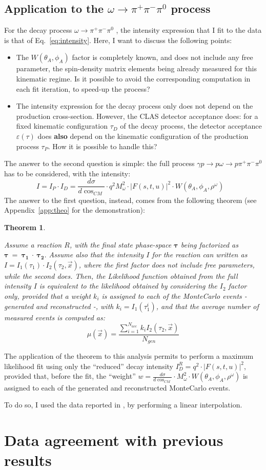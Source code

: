 \documentclass[a4paper,10pt]{report}
\newcommand{\decay}{$\omega \rightarrow \pi^+ \pi^- \pi^0$ }
\newcommand{\fullreaction}{$\gamma p \rightarrow p \omega \rightarrow p \pi^+ \pi^- \pi^{0}$ }
\newtheorem{theorem}{Theorem}
\newcommand{\printteolike}{
Assume a reaction $R$, with the final state phase-space $\mathbf{\tau}$ being factorized as $\mathbf{\tau}~=~\mathbf{\tau_1}~\cdot~\mathbf{\tau_2}$.
Assume also that the intensity $I$ for the reaction can written as $I=I_1(\tau_1) \cdot I_2(\tau_2,\vec{x})$,
where the first factor does not include free parameters, while the second does. Then, the Likelihood function obtained from the full intensity $I$ is equivalent to the
likelihood obtained by considering the $I_2$ factor only, provided that a weight $k_i$ is assigned to each of the MonteCarlo events -generated and reconstructed -, with $k_i=I_1(\tau^i_1)$, and that the average number of measured events is computed as:
\begin{equation}
\mu(\vec{x})=\frac{\sum_{i=1}^{N_{acc}}k_iI_2(\tau_2,\vec{x})}{N_{gen}}
\end{equation}
}
\begin{document}
\section{Application to the \decay process}\label{sec:application}

For the decay process \decay, the intensity expression that I fit to the data is that of Eq.~\ref{eq:intensity}. Here, I want to discuss the following points:
\begin{itemize}
\item{The $W(\theta_A,\phi_A)$ factor is completely known, and does not include any free parameter, the spin-density matrix elements being already measured for this kinematic regime.
Is it possible to avoid the corresponding computation in each fit iteration, to speed-up the process?}
\item{The intensity expression for the decay process only does not depend on the production cross-section. However, the CLAS detector acceptance does: for a fixed kinematic configuration $\tau_D$ of the decay process,
the detector acceptance $\varepsilon(\tau)$ does \textbf{also} depend on the kinematic configuration of the production process $\tau_P$. How it is possible to handle this?}
\end{itemize}

The answer to the second question is simple: the full process \fullreaction has to be considered, with the intensity:
\begin{equation}\label{eq:fullintensity}
I = I_P \cdot I_D = \frac{d\sigma}{d\cos_{CM}}\cdot q^2M^2_\omega \cdot |F(s,t,u)|^2 \cdot W(\theta_A, \phi_A, \rho^\omega) \; \; \;
\end{equation}
The answer to the first question, instead, comes from the following theorem (see Appendix~\ref{app:theo} for the demonstration):
\begin{theorem}
\label{theorem}
\printteolike
\end{theorem}

The application of the theorem to this analysis permits to perform a maximum likelihood fit using only the ``reduced'' decay intensity $I^{R}_D=q^2\cdot |F(s,t,u)|^2$, provided that, before the fit, the ``weight'' 
$w= \frac{d\sigma}{d\cos_{CM}}\cdot M^2_\omega \cdot W(\theta_A, \phi_A, \rho^\omega)$ is assigned to each of the generated and reconstructed MonteCarlo events.

To do so, I used the data reported in \cite{Williams:2009ab}, by performing a linear interpolation. 

\chapter{Data agreement with previous results}
\end{document}
